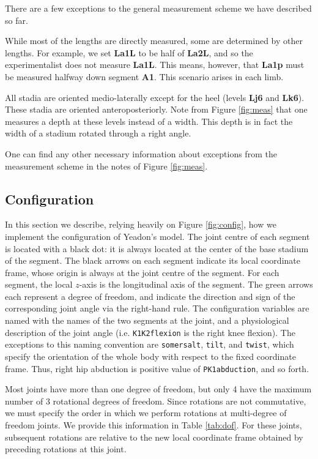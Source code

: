 \documentclass[10pt]{article}
\begin{document}
There are a few exceptions to the general measurement scheme we have described
so far.

While most of the lengths are directly measured, some are determined by other
lengths. For example, we set \textbf{La1L} to be half of \textbf{La2L}, and so
the experimentalist does not measure \textbf{La1L}. This means, however, that
\textbf{La1p} must be measured halfway down segment \textbf{A1}. This scenario
arises in each limb.

All stadia are oriented medio-laterally except for the heel (levels
\textbf{Lj6} and \textbf{Lk6}). These stadia are oriented anteroposteriorly.
Note from Figure \ref{fig:meas} that one measures a depth at these levels
instead of a width. This depth is in fact the width of a stadium rotated
through a right angle.

One can find any other necessary information about exceptions from the
measurement scheme in the notes of Figure \ref{fig:meas}.

\subsection*{Configuration}

In this section we describe, relying heavily on Figure \ref{fig:config}, how
we implement the configuration of Yeadon's model. The joint centre of each
segment is located with a black dot: it is always located at the center of the
base stadium of the segment. The black arrows on each segment indicate its
local coordinate frame, whose origin is always at the joint centre of the
segment. For each segment, the local $z$-axis is the longitudinal axis of the
segment. The green arrows each represent a degree of freedom, and indicate the
direction and sign of the corresponding joint angle via the right-hand rule.
The configuration variables are named with the names of the two segments at
the joint, and a physiological description of the joint angle (i.e.
\verb+K1K2flexion+ is the right knee flexion). The exceptions to this naming
convention are \verb+somersalt+, \verb+tilt+, and \verb+twist+, which specify
the orientation of the whole body with respect to the fixed coordinate frame.
Thus, right hip abduction is positive value of \verb+PK1abduction+, and so
forth.

Most joints have more than one degree of freedom, but only 4 have the maximum
number of 3 rotational degrees of freedom. Since rotations are not commutative,
we must specify the order in which we perform rotations at multi-degree of
freedom joints. We provide this information in Table \ref{tab:dof}. For these
joints, subsequent rotations are relative to the new local coordinate frame
obtained by preceding rotations at this joint.
\end{document}
